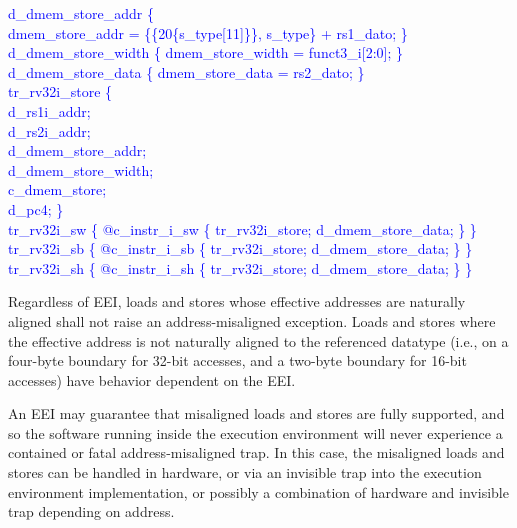 \textcolor{blue}{
   d\_dmem\_store\_addr \{\\%
\indent \indent dmem\_store\_addr = \{\{20\{s\_type[11]\}\}, s\_type\} + rs1\_dato; \}\\%
\indent d\_dmem\_store\_width \{ dmem\_store\_width = funct3\_i[2:0]; \}\\%
\indent d\_dmem\_store\_data \{ dmem\_store\_data = rs2\_dato; \}\\%
\indent tr\_rv32i\_store \{\\%
\indent \hspace{\parindent} d\_rs1i\_addr; \\%
\indent \hspace{\parindent} d\_rs2i\_addr; \\%
\indent \hspace{\parindent} d\_dmem\_store\_addr; \\%
\indent \hspace{\parindent} d\_dmem\_store\_width; \\%
\indent \hspace{\parindent} c\_dmem\_store; \\%
\indent \hspace{\parindent} d\_pc4; \} \\%
\indent tr\_rv32i\_sw \{ @c\_instr\_i\_sw \{ tr\_rv32i\_store;  d\_dmem\_store\_data; \} \}\\%
\indent tr\_rv32i\_sb \{ @c\_instr\_i\_sb \{ tr\_rv32i\_store;  d\_dmem\_store\_data; \} \}\\%
\indent tr\_rv32i\_sh \{ @c\_instr\_i\_sh \{ tr\_rv32i\_store;  d\_dmem\_store\_data; \} \}\\%
}


Regardless of EEI, loads and stores whose effective addresses are
naturally aligned shall not raise an address-misaligned exception.
Loads and stores where the effective address is not naturally aligned
to the referenced datatype (i.e., on a four-byte boundary for 32-bit
accesses, and a two-byte boundary for 16-bit accesses) have behavior
dependent on the EEI.

An EEI may guarantee that misaligned loads and stores are fully
supported, and so the software running inside the execution
environment will never experience a contained or fatal
address-misaligned trap.  In this case, the misaligned loads and
stores can be handled in hardware, or via an invisible trap into the
execution environment implementation, or possibly a combination of
hardware and invisible trap depending on address.

